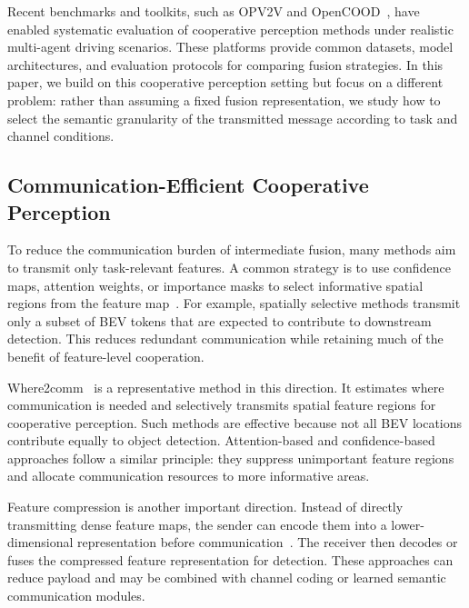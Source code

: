 \documentclass[journal]{IEEEtran}
\begin{document}
Recent benchmarks and toolkits, such as OPV2V and OpenCOOD~\cite{xu2022opv2v}, have enabled systematic evaluation of cooperative perception methods under realistic multi-agent driving scenarios. These platforms provide common datasets, model architectures, and evaluation protocols for comparing fusion strategies. In this paper, we build on this cooperative perception setting but focus on a different problem: rather than assuming a fixed fusion representation, we study how to select the semantic granularity of the transmitted message according to task and channel conditions.

\subsection{Communication-Efficient Cooperative Perception}

To reduce the communication burden of intermediate fusion, many methods aim to transmit only task-relevant features. A common strategy is to use confidence maps, attention weights, or importance masks to select informative spatial regions from the feature map~\cite{hu2022where2comm,sheng2024importance}. For example, spatially selective methods transmit only a subset of BEV tokens that are expected to contribute to downstream detection. This reduces redundant communication while retaining much of the benefit of feature-level cooperation.

Where2comm~\cite{hu2022where2comm} is a representative method in this direction. It estimates where communication is needed and selectively transmits spatial feature regions for cooperative perception. Such methods are effective because not all BEV locations contribute equally to object detection. Attention-based and confidence-based approaches follow a similar principle: they suppress unimportant feature regions and allocate communication resources to more informative areas.

Feature compression is another important direction. Instead of directly transmitting dense feature maps, the sender can encode them into a lower-dimensional representation before communication~\cite{sheng2024importance}. The receiver then decodes or fuses the compressed feature representation for detection. These approaches can reduce payload and may be combined with channel coding or learned semantic communication modules.
\end{document}

